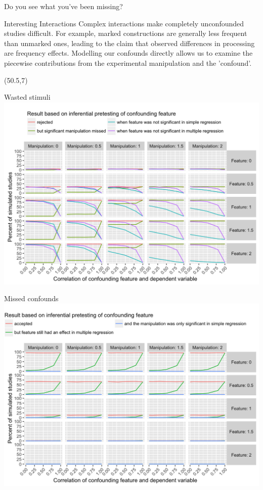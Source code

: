 \documentclass[final]{beamer}
\begin{document}
\begin{frame}{}
\begin{textblock}{48}
\begin{block}{Do you see what you've been missing?}
\end{block}

\begin{block}{Interesting Interactions}
Complex interactions make completely unconfounded studies difficult. 
For example, marked constructions are generally less frequent than unmarked ones, leading to the claim that observed differences in processing are frequency effects.
Modelling our confounds directly allows us to examine the piecewise contributions from the experimental manipulation and the 'confound'.
\end{block}

\end{textblock}

\begin{textblock}{48}(50.5,7)

\begin{block}{Wasted stimuli}
\includegraphics{rejections.png}
\end{block}

\begin{block}{Missed confounds}
\includegraphics{acceptances.png}
\end{block}


\end{textblock}
\end{frame}
\end{document}
